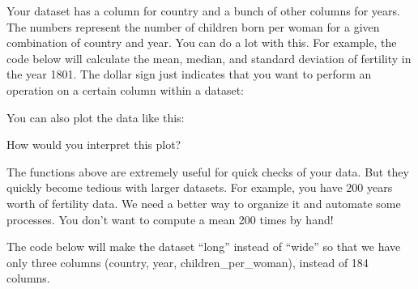 \documentclass[]{article}
\newenvironment{Shaded}{\begin{snugshade}}{\end{snugshade}}
\newcommand{\KeywordTok}[1]{\textcolor[rgb]{0.13,0.29,0.53}{\textbf{#1}}}
\newcommand{\DataTypeTok}[1]{\textcolor[rgb]{0.13,0.29,0.53}{#1}}
\newcommand{\StringTok}[1]{\textcolor[rgb]{0.31,0.60,0.02}{#1}}
\newcommand{\CommentTok}[1]{\textcolor[rgb]{0.56,0.35,0.01}{\textit{#1}}}
\newcommand{\OperatorTok}[1]{\textcolor[rgb]{0.81,0.36,0.00}{\textbf{#1}}}
\newcommand{\NormalTok}[1]{#1}
\begin{document}
Your dataset has a column for country and a bunch of other columns for
years. The numbers represent the number of children born per woman for a
given combination of country and year. You can do a lot with this. For
example, the code below will calculate the mean, median, and standard
deviation of fertility in the year 1801. The dollar sign just indicates
that you want to perform an operation on a certain column within a
dataset:

\begin{Shaded}
\end{Shaded}

You can also plot the data like this:

\begin{Shaded}
\end{Shaded}

How would you interpret this plot?

The functions above are extremely useful for quick checks of your data.
But they quickly become tedious with larger datasets. For example, you
have 200 years worth of fertility data. We need a better way to organize
it and automate some processes. You don't want to compute a mean 200
times by hand!

The code below will make the dataset ``long'' instead of ``wide'' so
that we have only three columns (country, year, children\_per\_woman),
instead of 184 columns.

\begin{Shaded}
\end{Shaded}
\end{document}
